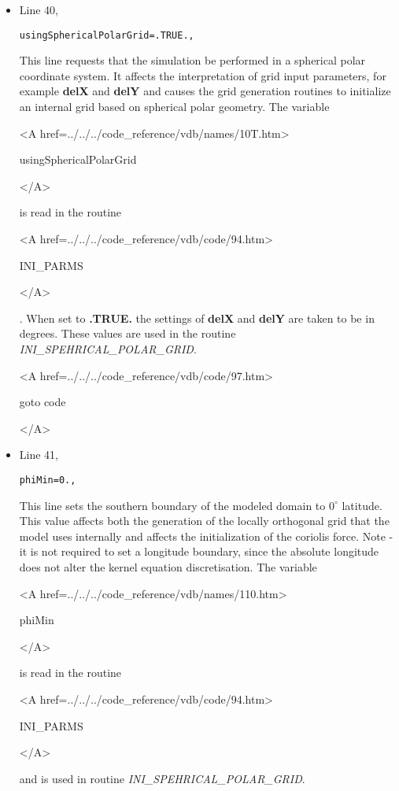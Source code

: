 \begin{itemize}
\item Line 40,
\begin{verbatim}
usingSphericalPolarGrid=.TRUE.,
\end{verbatim}
This line requests that the simulation be performed in a 
spherical polar coordinate system. It affects the interpretation of
grid input parameters, for example {\bf delX} and {\bf delY} and
causes the grid generation routines to initialize an internal grid based
on spherical polar geometry.
The variable
{\bf
\begin{rawhtml} <A href=../../../code_reference/vdb/names/10T.htm> \end{rawhtml}
usingSphericalPolarGrid
\begin{rawhtml} </A>\end{rawhtml}
}
is read in the routine
{\it
\begin{rawhtml} <A href=../../../code_reference/vdb/code/94.htm> \end{rawhtml}
INI\_PARMS
\begin{rawhtml} </A>\end{rawhtml}
}. When set to {\bf .TRUE.} the settings of {\bf delX} and {\bf delY} are
taken to be in degrees. These values are used in the
routine {\it INI\_SPEHRICAL\_POLAR\_GRID}.

{\bf
\begin{rawhtml} <A href=../../../code_reference/vdb/code/97.htm> \end{rawhtml}
goto code
\begin{rawhtml} </A>\end{rawhtml}
}

\item Line 41,
\begin{verbatim}
phiMin=0.,
\end{verbatim}
This line sets the southern boundary of the modeled
domain to $0^{\circ}$ latitude. This value affects both the
generation of the locally orthogonal grid that the model
uses internally and affects the initialization of the coriolis force.
Note - it is not required to set
a longitude boundary, since the absolute longitude does
not alter the kernel equation discretisation.
The variable
{\bf
\begin{rawhtml} <A href=../../../code_reference/vdb/names/110.htm> \end{rawhtml}
phiMin
\begin{rawhtml} </A>\end{rawhtml}
}
is read in the routine
{\it
\begin{rawhtml} <A href=../../../code_reference/vdb/code/94.htm> \end{rawhtml}
INI\_PARMS
\begin{rawhtml} </A>\end{rawhtml}
} and is used in routine {\it INI\_SPEHRICAL\_POLAR\_GRID}.


\end{itemize}
